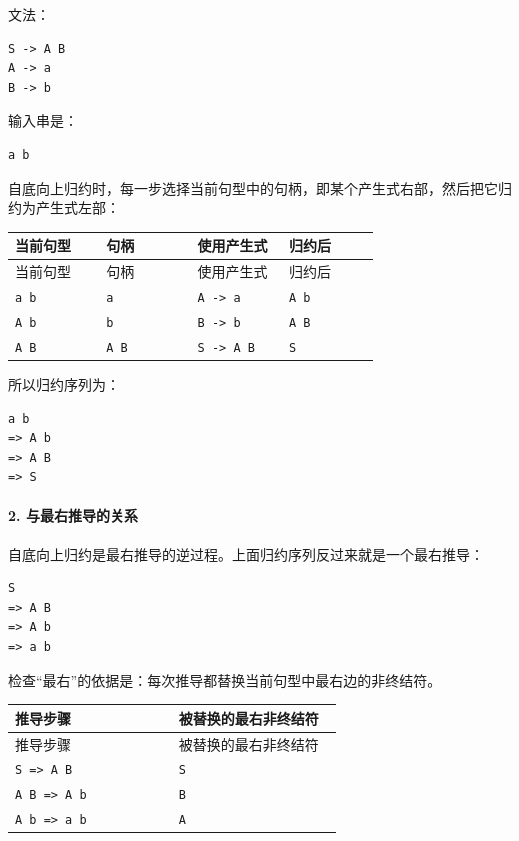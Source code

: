 \documentclass[UTF8]{ctexart}
\begin{document}
文法：

\begin{Verbatim}[fontsize=\small,breaklines=true]
S -> A B
A -> a
B -> b
\end{Verbatim}

输入串是：

\begin{Verbatim}[fontsize=\small,breaklines=true]
a b
\end{Verbatim}

自底向上归约时，每一步选择当前句型中的句柄，即某个产生式右部，然后把它归约为产生式左部：

\begin{longtable}{|p{0.23\linewidth}|p{0.23\linewidth}|p{0.23\linewidth}|p{0.23\linewidth}|}
\hline
当前句型 & 句柄 & 使用产生式 & 归约后 \\
\hline
\endfirsthead
当前句型 & 句柄 & 使用产生式 & 归约后 \\
\hline
\endhead
\texttt{a b} & \texttt{a} & \texttt{A -> a} & \texttt{A b} \\
\hline
\texttt{A b} & \texttt{b} & \texttt{B -> b} & \texttt{A B} \\
\hline
\texttt{A B} & \texttt{A B} & \texttt{S -> A B} & \texttt{S} \\
\hline
\end{longtable}

所以归约序列为：

\begin{Verbatim}[fontsize=\small,breaklines=true]
a b
=> A b
=> A B
=> S
\end{Verbatim}

\paragraph*{2. 与最右推导的关系}

自底向上归约是最右推导的逆过程。上面归约序列反过来就是一个最右推导：

\begin{Verbatim}[fontsize=\small,breaklines=true]
S
=> A B
=> A b
=> a b
\end{Verbatim}

检查“最右”的依据是：每次推导都替换当前句型中最右边的非终结符。

\begin{longtable}{|p{0.47\linewidth}|p{0.47\linewidth}|}
\hline
推导步骤 & 被替换的最右非终结符 \\
\hline
\endfirsthead
推导步骤 & 被替换的最右非终结符 \\
\hline
\endhead
\texttt{S => A B} & \texttt{S} \\
\hline
\texttt{A B => A b} & \texttt{B} \\
\hline
\texttt{A b => a b} & \texttt{A} \\
\hline
\end{longtable}
\end{document}
